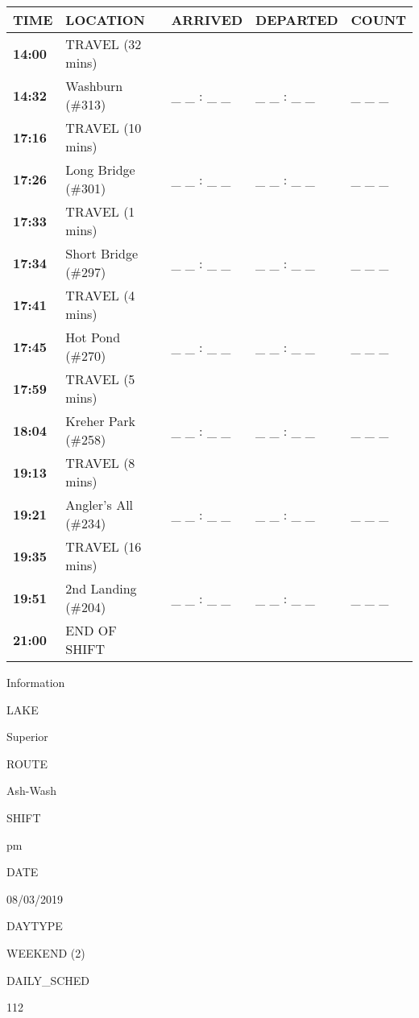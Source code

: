 \documentclass[]{article}
\begin{document}
\begin{tabular}{>{\bfseries}lllll}
\toprule
\textbf{TIME} & \textbf{LOCATION} & \textbf{ARRIVED} & \textbf{DEPARTED} & \textbf{COUNT}\\
\midrule
14:00 & TRAVEL (32 mins) &  &  & \\
14:32 & Washburn (\#313) & \_ \_ : \_ \_ & \_ \_ : \_ \_ & \_ \_ \_\\
17:16 & TRAVEL (10 mins) &  &  & \\
17:26 & Long Bridge (\#301) & \_ \_ : \_ \_ & \_ \_ : \_ \_ & \_ \_ \_\\
17:33 & TRAVEL (1 mins) &  &  & \\
17:34 & Short Bridge (\#297) & \_ \_ : \_ \_ & \_ \_ : \_ \_ & \_ \_ \_\\
17:41 & TRAVEL (4 mins) &  &  & \\
17:45 & Hot Pond (\#270) & \_ \_ : \_ \_ & \_ \_ : \_ \_ & \_ \_ \_\\
17:59 & TRAVEL (5 mins) &  &  & \\
18:04 & Kreher Park (\#258) & \_ \_ : \_ \_ & \_ \_ : \_ \_ & \_ \_ \_\\
19:13 & TRAVEL (8 mins) &  &  & \\
19:21 & Angler's All (\#234) & \_ \_ : \_ \_ & \_ \_ : \_ \_ & \_ \_ \_\\
19:35 & TRAVEL (16 mins) &  &  & \\
19:51 & 2nd Landing (\#204) & \_ \_ : \_ \_ & \_ \_ : \_ \_ & \_ \_ \_\\
21:00 & END OF SHIFT &  &  & \\
\bottomrule
\end{tabular}\newpage

Information

LAKE

Superior

ROUTE

Ash-Wash

SHIFT

pm

DATE

08/03/2019

DAYTYPE

WEEKEND (2)

DAILY\_SCHED

112

\vspace{24pt}
\end{document}
